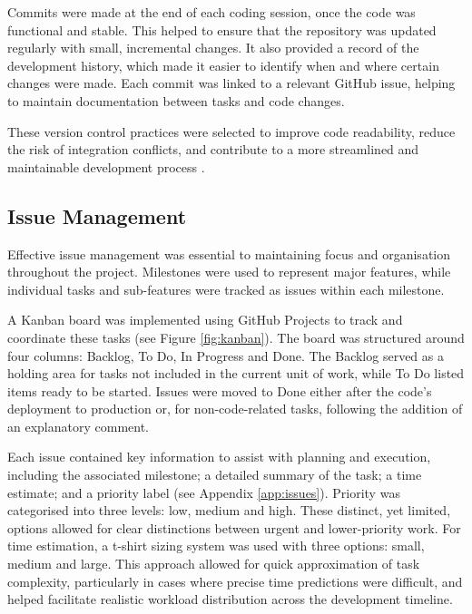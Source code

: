 \documentclass{l4proj}
\begin{document}
Commits were made at the end of each coding session, once the code was functional and stable. This helped to ensure that the repository was updated regularly with small, incremental changes. It also provided a record of the development history, which made it easier to identify when and where certain changes were made. Each commit was linked to a relevant GitHub issue, helping to maintain documentation between tasks and code changes.

These version control practices were selected to improve code readability, reduce the risk of integration conflicts, and contribute to a more streamlined and maintainable development process \citep{chacon_straub_git}.

\subsection{Issue Management}
Effective issue management was essential to maintaining focus and organisation throughout the project. Milestones were used to represent major features, while individual tasks and sub-features were tracked as issues within each milestone. 

A Kanban board was implemented using GitHub Projects to track and coordinate these tasks (see Figure \ref{fig:kanban}). The board was structured around four columns: Backlog, To Do, In Progress and Done. The Backlog served as a holding area for tasks not included in the current unit of work, while To Do listed items ready to be started. Issues were moved to Done either after the code’s deployment to production or, for non-code-related tasks, following the addition of an explanatory comment.

Each issue contained key information to assist with planning and execution, including the associated milestone; a detailed summary of the task; a time estimate; and a priority label (see Appendix \ref{app:issues}). Priority was categorised into three levels: low, medium and high. These distinct, yet limited, options allowed for clear distinctions between urgent and lower-priority work. For time estimation, a t-shirt sizing system was used with three options: small, medium and large.  This approach allowed for quick approximation of task complexity, particularly in cases where precise time predictions were difficult, and helped facilitate realistic workload distribution across the development timeline.
\end{document}
